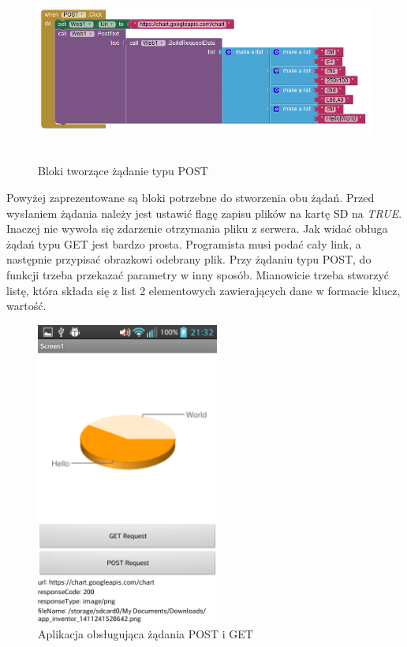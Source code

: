 \begin{figure}[H]
\centering\includegraphics[height=6cm]{figures/apps/postRequest}
\caption{Bloki tworzące żądanie typu POST}
\end{figure}

Powyżej zaprezentowane są bloki potrzebne do stworzenia obu żądań. Przed wysłaniem żądania należy jest ustawić flagę zapisu plików na kartę SD na \emph{TRUE}. Inaczej nie wywoła się zdarzenie otrzymania pliku z serwera. Jak widać obługa żądań typu GET jest bardzo prosta. Programista musi podać cały link, a następnie przypisać obrazkowi odebrany plik. Przy żądaniu typu POST, do funkcji trzeba przekazać parametry w inny sposób. Mianowicie trzeba stworzyć listę, która składa się z list 2 elementowych zawierających dane w formacie klucz, wartość.


\begin{figure}[H]
\centering\includegraphics[height=10cm]{figures/apps/googleChart}
\caption{Aplikacja obsługująca żądania POST i GET}
\end{figure}

